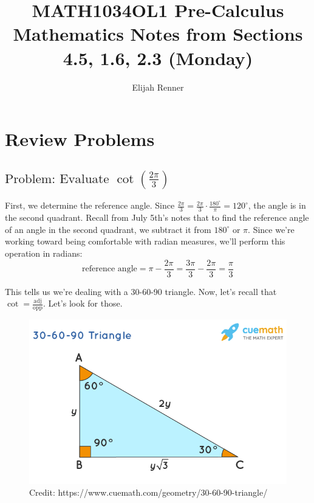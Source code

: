 \documentclass[12pt]{article}
\title{MATH1034OL1 Pre-Calculus Mathematics Notes from Sections 4.5, 1.6, 2.3 (Monday)}
\author{Elijah Renner}
\begin{document}
\maketitle

\vspace{0.5in}

\tableofcontents


\section{Review Problems}


\subsection{\(\text{Problem: Evaluate }
\cot \left( \frac{2\pi}{3} \right)\)}

First, we determine the reference angle. Since \(\frac{2\pi}{3}=\frac{2\pi}{3}\cdot\frac{180^{\circ}}{\pi}=120^{\circ}\), the angle is in the second quadrant. Recall from July 5th's notes that to find the reference angle of an angle in the second quadrant, we subtract it from \(180^{\circ}\) or \(\pi\). Since we're working toward being comfortable with radian measures, we'll perform this operation in radians:\\

\[\text{reference angle}=\pi-\frac{2\pi}{3}=\frac{3\pi}{3}-\frac{2\pi}{3}=\frac{\pi}{3}\]

This tells us we're dealing with a 30-60-90 triangle. Now, let's recall that \(\cot=\frac{\text{adj}}{\text{opp}}\). Let's look for those.

\begin{figure}[H]
	\centering
	\includegraphics[scale=0.5]{30-60-90-triangle-1621153010.png}
	\caption{Credit: https://www.cuemath.com/geometry/30-60-90-triangle/}
\end{figure}
\end{document}
